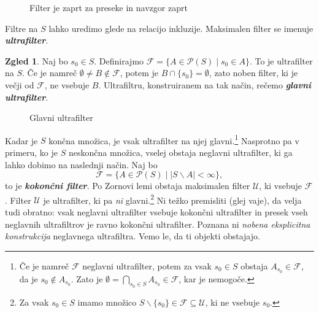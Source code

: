\documentclass[11pt]{book}
\def\FF{\mathcal{F}}
\def\PP{\mathcal{P}}
\def\UU{\mathcal{U}}
\def\definicija{\color{rdeca}\bf\em}
\def\literatura{\color{modra}}
\def\vaje{{\literatura (glej vaje)}}
\theoremstyle{definition}
\theoremstyle{zgled}
\newtheorem*{zgled}{Zgled}
\theoremstyle{odprtproblem}
\theoremstyle{domacanaloga}
\theoremstyle{izrek}
\begin{document}
\begin{figure}[t]
\centering
{}
\caption{Filter je zaprt za preseke in navzgor zaprt}
\end{figure}

Filtre na $S$ lahko uredimo glede na relacijo inkluzije. Maksimalen filter se imenuje {\definicija ultrafilter}.

\begin{zgled}
Naj bo $s_0 \in S$. Definirajmo $\FF = \{ A \in \PP(S) \mid s_0 \in A \}$. To je ultrafilter na $S$. Če je namreč $\emptyset \neq B \notin \FF$, potem je $B \cap \{ s_0 \} = \emptyset$, zato noben filter, ki je večji od $\FF$, ne vsebuje $B$. Ultrafiltru, konstruiranem na tak način, rečemo {\definicija glavni ultrafilter}.

\begin{figure}[t]
\centering
{}
\caption{Glavni ultrafilter}
\end{figure}
\end{zgled}

Kadar je $S$ končna množica, je vsak ultrafilter na njej glavni.\footnote{Če je namreč $\FF$ neglavni ultrafilter, potem za vsak $s_0 \in S$ obstaja $A_{s_0} \in \FF$, da je $s_0 \notin A_{s_0}$. Zato je $\emptyset = \bigcap_{s_0 \in S} A_{s_0} \in \FF$, kar je nemogoče.} Nasprotno pa v primeru, ko je $S$ neskončna množica, vselej obstaja neglavni ultrafilter, ki ga lahko dobimo na naslednji način. Naj bo
\[
\FF = \{ A \in \PP(S) \mid |S \backslash A| < \infty \}, 
\]
to je {\definicija kokončni filter}. Po Zornovi lemi obstaja maksimalen filter $\UU$, ki vsebuje $\FF$. Filter $\UU$ je ultrafilter, ki pa {\em ni} glavni.\footnote{Za vsak $s_0 \in S$ imamo množico $S \backslash \{ s_0 \} \in \FF \subseteq \UU$, ki ne vsebuje $s_0$.} Ni težko premisliti \vaje, da velja tudi obratno: vsak neglavni ultrafilter vsebuje kokončni ultrafilter in presek vseh neglavnih ultrafiltrov je ravno kokončni ultrafilter. Poznana ni {\em nobena eksplicitna konstrukcija} neglavnega ultrafiltra. Vemo le, da ti objekti obstajajo.
\end{document}
